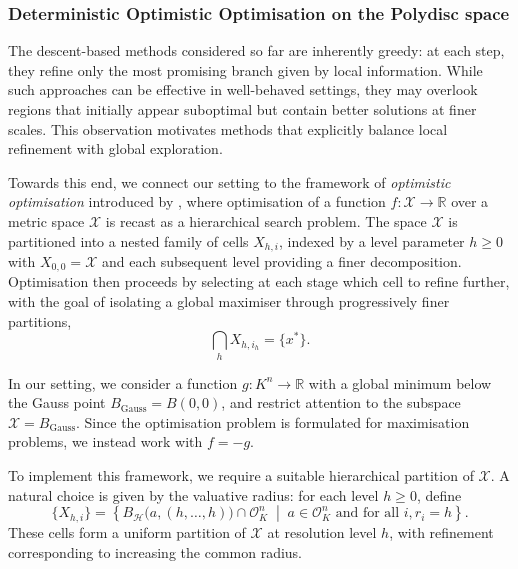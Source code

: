 \documentclass[10pt]{article}
\theoremstyle{definition}
\newcommand{\RR}{\mathbb{R}}
\begin{document}
\subsubsection{Deterministic Optimistic Optimisation on the Polydisc space} \label{subsec:doo}

The descent-based methods considered so far are inherently greedy: at each step, they refine only the most promising branch given by local information. While such approaches can be effective in well-behaved settings, they may overlook regions that initially appear suboptimal but contain better solutions at finer scales. This observation motivates methods that explicitly balance local refinement with global exploration.

Towards this end, we connect our setting to the framework of \emph{optimistic optimisation} introduced by \cite{munos2011optimistic}, where optimisation of a function $f\colon \mathcal{X} \to \mathbb{R}$ over a metric space $\mathcal{X}$ is recast as a hierarchical search problem. The space $\mathcal{X}$ is partitioned into a nested family of cells $X_{h, i}$, indexed by a level parameter $h \geq 0$ with $X_{0, 0} = \mathcal{X}$ and each subsequent level providing a finer decomposition. Optimisation then proceeds by selecting at each stage which cell to refine further, with the goal of isolating a global maximiser through progressively finer partitions,
$$
    \bigcap_h X_{h, i_h} = \{ x^* \}.
$$

In our setting, we consider a function $g \colon K^n \to \RR$ with a global minimum below the Gauss point $B_\text{Gauss} = B(0, 0)$, and restrict attention to the subspace $\mathcal{X} = B_\text{Gauss}$. Since the optimisation problem is formulated for maximisation problems, we instead work with $f = -g$.

To implement this framework, we require a suitable hierarchical partition of $\mathcal{X}$. A natural choice is given by the valuative radius: for each level $h \geq 0$, define
$$
\{ X_{h,i} \}
= \left\{ B_{\mathcal{H}}\big(a, (h,\dotsc,h)\big) \cap \mathcal{O}_K^n
\;\middle|\;
a \in \mathcal{O}_K^n \text{ and for all } i, r_i = h \right\}.
$$
These cells form a uniform partition of $\mathcal{X}$ at resolution level $h$, with refinement corresponding to increasing the common radius.
\end{document}
